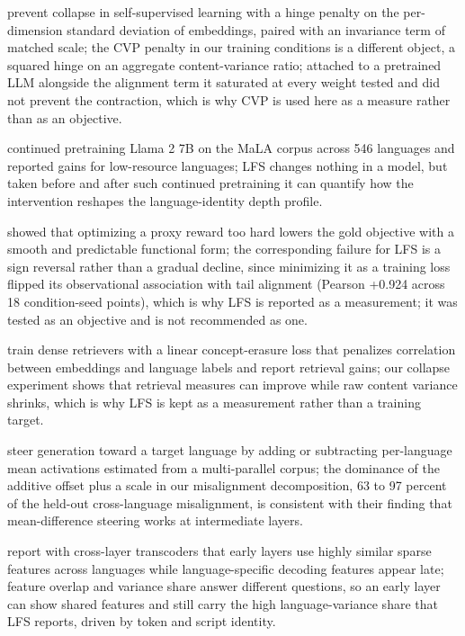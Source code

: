 \documentclass{article} %
\begin{document}
\citet{bardes2022vicreg} prevent collapse in self-supervised learning with a hinge penalty on the per-dimension standard deviation of embeddings, paired with an invariance term of matched scale; the CVP penalty in our training conditions is a different object, a squared hinge on an aggregate content-variance ratio; attached to a pretrained LLM alongside the alignment term it saturated at every weight tested and did not prevent the contraction, which is why CVP is used here as a measure rather than as an objective.

\citet{ji2024emma} continued pretraining Llama 2 7B on the MaLA corpus across 546 languages and reported gains for low-resource languages; LFS changes nothing in a model, but taken before and after such continued pretraining it can quantify how the intervention reshapes the language-identity depth profile.

\citet{gao2023scaling} showed that optimizing a proxy reward too hard lowers the gold objective with a smooth and predictable functional form; the corresponding failure for LFS is a sign reversal rather than a gradual decline, since minimizing it as a training loss flipped its observational association with tail alignment (Pearson +0.924 across 18 condition-seed points), which is why LFS is reported as a measurement; it was tested as an objective and is not recommended as one.

\citet{huang2024erasure} train dense retrievers with a linear concept-erasure loss that penalizes correlation between embeddings and language labels and report retrieval gains; our collapse experiment shows that retrieval measures can improve while raw content variance shrinks, which is why LFS is kept as a measurement rather than a training target.

\citet{sterz2025recover} steer generation toward a target language by adding or subtracting per-language mean activations estimated from a multi-parallel corpus; the dominance of the additive offset plus a scale in our misalignment decomposition, 63 to 97 percent of the held-out cross-language misalignment, is consistent with their finding that mean-difference steering works at intermediate layers.

\citet{harrasse2025transcoders} report with cross-layer transcoders that early layers use highly similar sparse features across languages while language-specific decoding features appear late; feature overlap and variance share answer different questions, so an early layer can show shared features and still carry the high language-variance share that LFS reports, driven by token and script identity.
\end{document}
